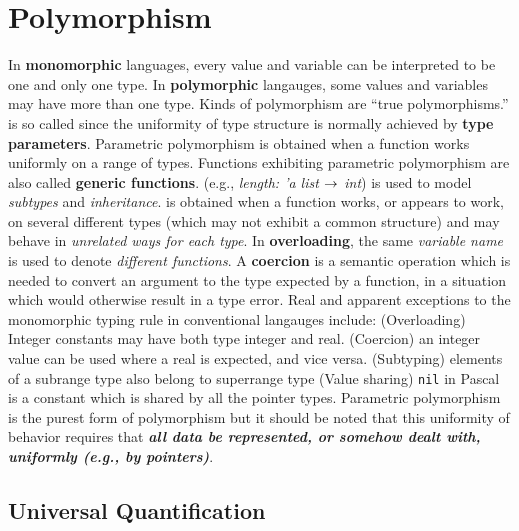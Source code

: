\documentclass{article}
\begin{document}
\section{Polymorphism}
\bit
\w In {\bf{}monomorphic} languages, every value and variable
	can be interpreted to be one and only one type.
\w In {\bf{}polymorphic} langauges, some values and variables may have
	more than one type.
\w Kinds of polymorphism
	\bit
		\bit
		\eit
		\bit
		\eit
	\eit
{} are ``true polymorphisms.''
	\bit
{} is so called since the uniformity
	of type structure is normally achieved by 
	{\bf{}type parameters}.
	\bit
	\w Parametric polymorphism is obtained when a function works
		uniformly on a range of types.
	\w Functions exhibiting parametric polymorphism are
		also called {\bf{}generic functions}. (e.g.,
		{\it{}length: 'a list $\mbox{$\rightarrow$}$ int})
		\eit
	 is used to model {\em{}subtypes\/}
		and {\em{}inheritance\/}.
	\eit
{} is obtained when a function works,
	or appears to work, on several different types (which may not
	exhibit a common structure) and may behave in {\em{}unrelated
	ways for each type\/}.
	\bit
	\w In {\bf{}overloading}, the same {\em{}variable name\/} is used
		to denote {\em{}different functions\/}.
	\w A {\bf{}coercion} is a semantic operation which is needed to
		convert an argument to the type expected by a function, in 
		a situation which would otherwise result in a type error.
	\eit
\w Real and apparent exceptions to the monomorphic typing rule in 
	conventional langauges include:
	\ben
	\w (Overloading) Integer constants may have both type integer
		and real.
	\w (Coercion) an integer value can be used where a real is
		expected, and vice versa.
	\w (Subtyping) elements of a subrange type also belong to superrange
		type
	\w (Value sharing) {\tt{}nil} in Pascal is a constant which is
		shared by all the pointer types.
	\een
\w Parametric polymorphism is the purest form of polymorphism but
	it should be noted that this uniformity of behavior
	requires that {\sl\bfseries{}all data be represented,
	or somehow dealt with, uniformly (e.g., by pointers)}.
\eit

\subsection{Universal Quantification}
\end{document}
